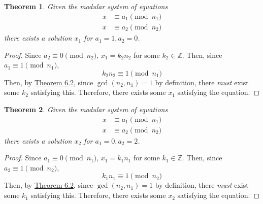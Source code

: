 \documentclass{article}
\newtheorem{theorem}{Theorem}
\newcommand{\Z}{\mathbb{Z}}
\begin{document}
\subsection{}

\begin{theorem}
    Given the modular system of equations
    \begin{align}
        x &\equiv a_1 \pmod{n_1} \\
        x &\equiv a_2 \pmod{n_2}
    \end{align}
    there exists a solution \(x_1\) for \(a_1 = 1, a_2 = 0\).
\end{theorem}
\begin{proof}
    Since \(a_2 \equiv 0 \pmod{n_2}\), \(x_1 = k_2 n_2\) for some \(k_2 \in \Z\).
    Then, since \(a_1 \equiv 1 \pmod{n_1}\),
    \begin{equation}
        k_2 n_2 \equiv 1 \pmod{n_1}
    \end{equation}
    Then, by \href{https://www.eecs70.org/static/notes/n6.pdf}{Theorem 6.2}, since \(\gcd(n_2, n_1) = 1\) by definition, there \emph{must} exist some \(k_2\) satisfying this.
    Therefore, there exists some \(x_1\) satisfying the equation.
\end{proof}
\begin{theorem}
    Given the modular system of equations
    \begin{align}
        x &\equiv a_1 \pmod{n_1} \\
        x &\equiv a_2 \pmod{n_2}
    \end{align}
    there exists a solution \(x_2\) for \(a_1 = 0, a_2 = 2\).
\end{theorem}
\begin{proof}
    Since \(a_1 \equiv 0 \pmod{n_1}\), \(x_1 = k_1 n_1\) for some \(k_1 \in \Z\).
    Then, since \(a_2 \equiv 1 \pmod{n_2}\),
    \begin{equation}
        k_1 n_1 \equiv 1 \pmod{n_2}
    \end{equation}
    Then, by \href{https://www.eecs70.org/static/notes/n6.pdf}{Theorem 6.2}, since \(\gcd(n_2, n_1) = 1\) by definition, there \emph{must} exist some \(k_1\) satisfying this.
    Therefore, there exists some \(x_2\) satisfying the equation.
\end{proof}

\subsection{}
\end{document}
